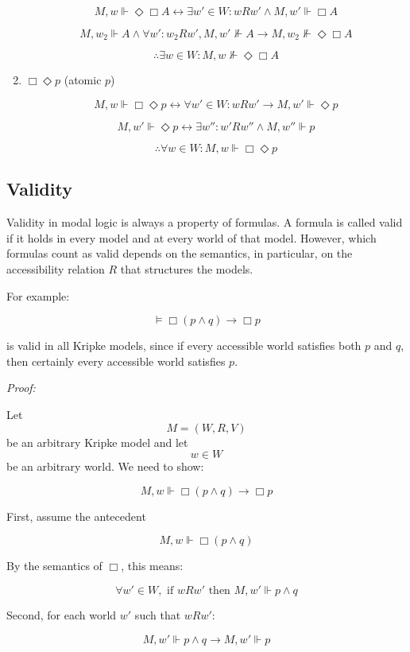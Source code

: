 \documentclass[12pt,a4paper,openany]{article}
\begin{document}
\begin{enumerate}
    $$M, w \Vdash \Diamond \Box A \leftrightarrow \exists w' \in W: w R w' \wedge M, w' \Vdash \Box A$$
    
    $$M, w_2 \Vdash A \wedge \forall w': w_2 R w', M, w' \nVdash A \to M, w_2 \nVdash \Diamond \Box A$$
    
    $$\therefore \exists w \in W: M, w \nVdash \Diamond \Box A$$
    
    \item $\Box \Diamond p$ (atomic $p$)
    
    $$M, w \Vdash \Box \Diamond p \leftrightarrow \forall w' \in W: w R w' \to M, w' \Vdash \Diamond p$$
    
    $$M, w' \Vdash \Diamond p \leftrightarrow \exists w'': w' R w'' \wedge M, w'' \Vdash p$$
    
    $$\therefore \forall w \in W: M, w \Vdash \Box \Diamond p$$
\end{enumerate}

\subsection{Validity}

Validity in modal logic is always a property of formulas. A formula is called valid if it holds in every model and at every world of that model. However, which formulas count as valid depends on the semantics, in particular, on the accessibility relation $R$ that structures the models.

For example:

$$\models \Box(p \land q) \to \Box p$$

is valid in all Kripke models, since if every accessible world satisfies both $p$ and $q$, then certainly every accessible world satisfies $p$.

\textit{Proof:}

Let
$$M = (W, R, V)$$
be an arbitrary Kripke model and let
$$w \in W$$
be an arbitrary world. We need to show:

$$M, w \Vdash \Box(p \land q) \to \Box p$$

First, assume the antecedent

$$M, w \Vdash \Box(p \land q)$$

By the semantics of $\Box$, this means:

$$\forall w' \in W, \text{ if } w R w' \text{ then } M, w' \Vdash p \land q$$

Second, for each world $w'$ such that $w R w'$:

$$M, w' \Vdash p \land q \to M, w' \Vdash p$$
\end{document}
